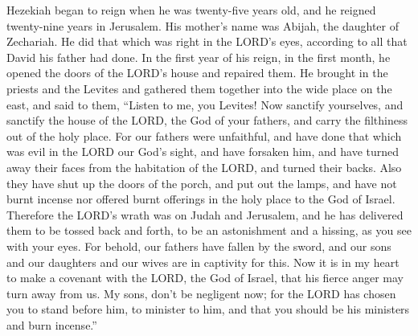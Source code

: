  Hezekiah began to reign when he was twenty-five years old,
and he reigned twenty-nine years in Jerusalem. His mother's name was
Abijah, the daughter of Zechariah.  He did that which was
right in the LORD's eyes, according to all that David his father had
done.  In the first year of his reign, in the first month,
he opened the doors of the LORD's house and repaired them. 
He brought in the priests and the Levites and gathered them together
into the wide place on the east,  and said to them, ``Listen
to me, you Levites! Now sanctify yourselves, and sanctify the house of
the LORD, the God of your fathers, and carry the filthiness out of the
holy place.  For our fathers were unfaithful, and have done
that which was evil in the LORD our God's sight, and have forsaken him,
and have turned away their faces from the habitation of the LORD, and
turned their backs.  Also they have shut up the doors of the
porch, and put out the lamps, and have not burnt incense nor offered
burnt offerings in the holy place to the God of Israel. 
Therefore the LORD's wrath was on Judah and Jerusalem, and he has
delivered them to be tossed back and forth, to be an astonishment and a
hissing, as you see with your eyes.  For behold, our fathers
have fallen by the sword, and our sons and our daughters and our wives
are in captivity for this.  Now it is in my heart to make a
covenant with the LORD, the God of Israel, that his fierce anger may
turn away from us.  My sons, don't be negligent now; for
the LORD has chosen you to stand before him, to minister to him, and
that you should be his ministers and burn incense.''

